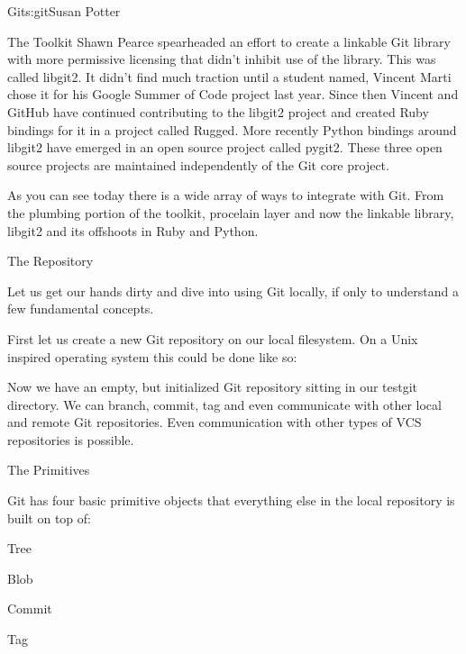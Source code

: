 \begin{aosachapter}{Git}{s:git}{Susan Potter}
\begin{aosasect1}{The Toolkit}
Shawn Pearce spearheaded an effort to create a linkable Git library with
more permissive licensing that didn't inhibit use of the library. This was 
called libgit2. It didn't find much traction until a student named, Vincent 
Marti chose it for his Google Summer of Code project last year. Since then 
Vincent and GitHub have continued contributing to the libgit2 project and 
created Ruby bindings for it in a project called Rugged. More recently 
Python bindings around libgit2 have emerged in an open source project 
called pygit2. These three open source projects are maintained independently 
of the Git core project.

As you can see today there is a wide array of ways to integrate with Git.
From the plumbing portion of the toolkit, procelain layer and now the
linkable library, libgit2 and its offshoots in Ruby and Python.
\end{aosasect1}

\begin{aosasect1}{The Repository}

Let us get our hands dirty and dive into using Git locally, if only to
understand a few fundamental concepts.

First let us create a new Git repository on our local filesystem. On a Unix 
inspired operating system this could be done like so:
\begin{aosaitemize}
  \item {}
  \item {}
  \item {}
\end{aosaitemize}

Now we have an empty, but initialized Git repository sitting in our testgit 
directory. We can branch, commit, tag and even communicate with other local
and remote Git repositories. Even communication with other types of VCS
repositories is possible.

\end{aosasect1}

\begin{aosasect1}{The Primitives}

Git has four basic primitive objects that everything else in the local
repository is built on top of:
\begin{aosaitemize}
  \item Tree
  \item Blob
  \item Commit
  \item Tag
\end{aosaitemize}


\end{aosasect1}
\end{aosachapter}
